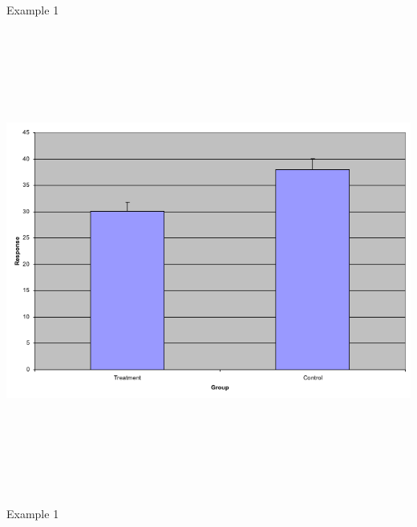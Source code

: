\documentclass[12pt]{article}
\newcommand{\headsize}{\fontsize{35}{35} \selectfont}
\begin{document}
\headsize \color{myyellow}
\hfill \begin{minipage}{5.75in}
\centering
Example 1
\end{minipage}

\vspace{30mm}

\centerline{\includegraphics[height=6in]{Figs/fig1c.png}}


\newpage


\headsize \color{myyellow}
\hfill \begin{minipage}{5.75in}
\centering
Example 1
\end{minipage}

\vspace{30mm}
\end{document}
